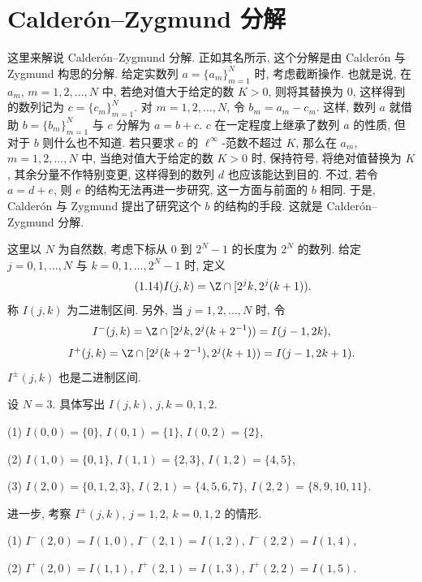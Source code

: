 \section{Calderón--Zygmund 分解}\label{sec:1.6}










这里来解说 Calderón--Zygmund 分解. 正如其名所示, 这个分解是由 Calderón 与 Zygmund 构思的分解. 给定实数列 $a = \{a_{m}\}_{m=1}^{N}$ 时, 考虑截断操作. 也就是说, 在 $a_{m}$, $m = 1, 2, \ldots, N$ 中, 若绝对值大于给定的数 $K > 0$, 则将其替换为 $0$, 这样得到的数列记为 $c = \{c_{m}\}_{m=1}^{N}$. 对 $m = 1, 2, \ldots, N$, 令 $b_{m} = a_{m} - c_{m}$. 这样, 数列 $a$ 就借助 $b = \{b_{m}\}_{m=1}^{N}$ 与 $c$ 分解为 $a = b + c$. $c$ 在一定程度上继承了数列 $a$ 的性质, 但对于 $b$ 则什么也不知道. 若只要求 $c$ 的 $\ell^{\infty}$-范数不超过 $K$, 那么在 $a_{m}$, $m = 1, 2, \ldots, N$ 中, 当绝对值大于给定的数 $K > 0$ 时, 保持符号, 将绝对值替换为 $K$, 其余分量不作特别变更, 这样得到的数列 $d$ 也应该能达到目的. 不过, 若令 $a = d + e$, 则 $e$ 的结构无法再进一步研究, 这一方面与前面的 $b$ 相同. 于是, Calderón 与 Zygmund 提出了研究这个 $b$ 的结构的手段. 这就是 Calderón--Zygmund 分解.

这里以 $N$ 为自然数, 考虑下标从 $0$ 到 $2^{N}-1$ 的长度为 $2^{N}$ 的数列. 给定 $j = 0, 1, \ldots, N$ 与 $k = 0, 1, \ldots, 2^{N}-1$ 时, 定义
\begin{equation}\tag{1.14}\label{eq:1.14}
I(j, k) = \Z \cap [2^{j}k, 2^{j}(k+1)).
\end{equation}
称 $I(j,k)$ 为二进制区间. 另外, 当 $j = 1, 2, \ldots, N$ 时, 令
\[
I^{-}(j, k) = \Z \cap [2^{j}k, 2^{j}(k + 2^{-1})) = I(j-1, 2k),
\]
\[
I^{+}(j, k) = \Z \cap [2^{j}(k + 2^{-1}), 2^{j}(k+1)) = I(j-1, 2k+1).
\]
$I^{\pm}(j,k)$ 也是二进制区间.

\begin{example}\label{exa:1.12}
设 $N = 3$. 具体写出 $I(j,k)$, $j, k = 0, 1, 2$.

(1) $I(0,0) = \{0\}$, $I(0,1) = \{1\}$, $I(0,2) = \{2\}$,

(2) $I(1,0) = \{0,1\}$, $I(1,1) = \{2,3\}$, $I(1,2) = \{4,5\}$,

(3) $I(2,0) = \{0,1,2,3\}$, $I(2,1) = \{4,5,6,7\}$, $I(2,2) = \{8,9,10,11\}$.

进一步, 考察 $I^{\pm}(j,k)$, $j = 1, 2$, $k = 0, 1, 2$ 的情形.

(1) $I^{-}(2,0) = I(1,0)$, $I^{-}(2,1) = I(1,2)$, $I^{-}(2,2) = I(1,4)$,

(2) $I^{+}(2,0) = I(1,1)$, $I^{+}(2,1) = I(1,3)$, $I^{+}(2,2) = I(1,5)$.
\end{example}

